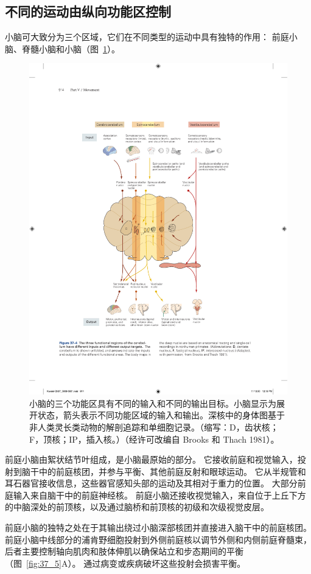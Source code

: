 \subsection{不同的运动由纵向功能区控制}

小脑可大致分为三个区域，它们在不同类型的运动中具有独特的作用：
前庭小脑、脊髓小脑和小脑（图~\ref{fig:37_4}）。


\begin{figure}[htbp]
	\centering
	\includegraphics[width=0.7\linewidth]{chap37/fig_37_4}
	\caption{小脑的三个功能区具有不同的输入和不同的输出目标。小脑显示为展开状态，箭头表示不同功能区域的输入和输出。深核中的身体图基于非人类灵长类动物的解剖追踪和单细胞记录。（缩写：D，齿状核；F，顶核；IP，插入核。）（经许可改编自 Brooks 和 Thach 1981）。}
	\label{fig:37_4}
\end{figure}


前庭小脑由絮状结节叶组成，是小脑最原始的部分。
它接收前庭和视觉输入，投射到脑干中的前庭核团，并参与平衡、其他前庭反射和眼球运动。
它从半规管和耳石器官接收信息，这些器官感知头部的运动及其相对于重力的位置。
大部分前庭输入来自脑干中的前庭神经核。
前庭小脑还接收视觉输入，来自位于上丘下方的中脑深处的前顶核，以及通过脑桥和前顶核的初级和次级视觉皮层。


前庭小脑的独特之处在于其输出绕过小脑深部核团并直接进入脑干中的前庭核团。
前庭小脑中线部分的浦肯野细胞投射到外侧前庭核以调节外侧和内侧前庭脊髓束，后者主要控制轴向肌肉和肢体伸肌以确保站立和步态期间的平衡（图~\ref{fig:37_5}A）。
通过病变或疾病破坏这些投射会损害平衡。


